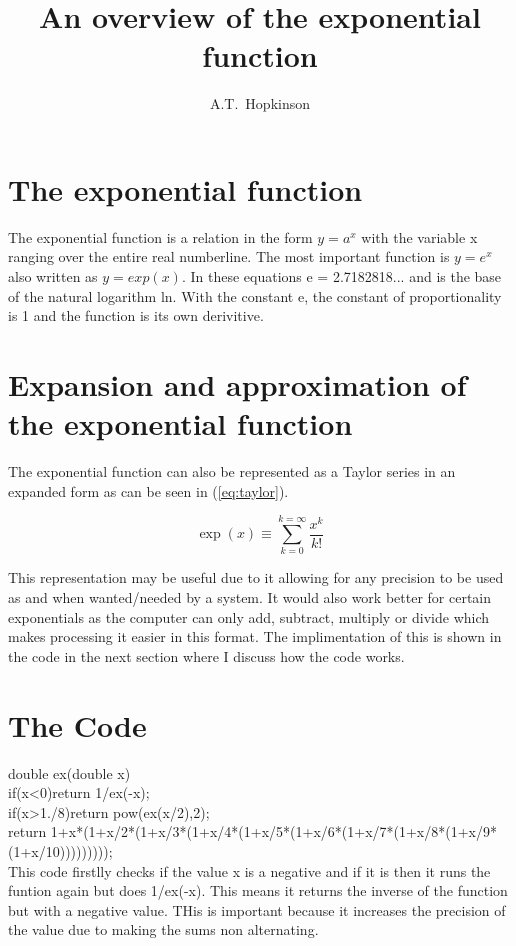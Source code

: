 \documentclass{article}
\title{An overview of the exponential function}
\author{A.T.~Hopkinson}
\date{}
\begin{document}
\maketitle
\section{The exponential function}
The exponential function is a relation in the form $y=a^x$ with the variable x ranging over the entire real numberline. The most important function is $y=e^x$ also written as $y=exp(x)$. In these equations e = 2.7182818... and is the base of the natural logarithm ln.
With the constant e, the constant of proportionality is 1 and the function is its own derivitive.

\section{Expansion and approximation of the exponential function}
The exponential function can also be represented as a Taylor series in an expanded form as can be seen in (\ref{eq:taylor}).

	\begin{equation}\label{eq:taylor}
\exp(x)\equiv\sum_{k=0}^{k=\infty}\frac{x^k}{k!}
	\end{equation}

This representation may be useful due to it allowing for any precision to be used as and when wanted/needed by a system. It would also work better for certain exponentials as the computer can only add, subtract, multiply or divide which makes processing it easier in this format.
The implimentation of this is shown in the code in the next section where I discuss how the code works.

\section{The Code}
double ex(double x)\\
	if(x<0)return 1/ex(-x);\\
	if(x>1./8)return pow(ex(x/2),2);\\
	return 1+x*(1+x/2*(1+x/3*(1+x/4*(1+x/5*(1+x/6*(1+x/7*(1+x/8*(1+x/9*(1+x/10)))))))));\\

This code firstlly checks if the value x is a negative and if it is then it runs the funtion again but does 1/ex(-x). This means it returns the inverse of the function but with a negative value. THis is important because it increases the precision of the value due to making the sums non alternating.
\end{document}
